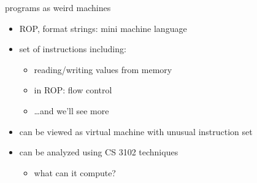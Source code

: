 \begin{frame}{programs as weird machines}
    \begin{itemize}
    \item ROP, format strings: mini machine language
    \item set of instructions including:
        \begin{itemize}
        \item reading/writing values from memory
        \item in ROP: flow control
        \item \ldots and we'll see more
        \end{itemize}
    \item can be viewed as virtual machine with unusual instruction set
    \vspace{.5cm}
    \item can be analyzed using CS 3102 techniques
        \begin{itemize}
        \item what can it compute?
        \end{itemize}
    \end{itemize}
\end{frame}

